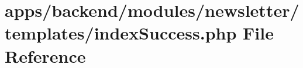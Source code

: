 \hypertarget{backend_2modules_2newsletter_2templates_2index_success_8php}{\section{apps/backend/modules/newsletter/templates/index\-Success.php File Reference}
\label{backend_2modules_2newsletter_2templates_2index_success_8php}
}
